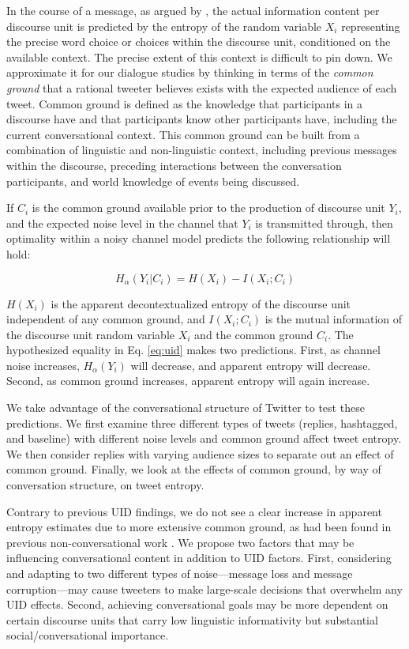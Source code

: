 \documentclass[11pt,letterpaper]{article}
\begin{document}
In the course of a message, as argued by , the actual information content per discourse unit is predicted by the entropy of the random variable $X_i$ representing the precise word choice or choices within the discourse unit, conditioned on the available context.  The precise extent of this context is difficult to pin down. We approximate it for our dialogue studies by thinking in terms of the {\it common ground} \cite{clark1996} that a rational tweeter believes exists with the expected audience of each tweet. Common ground is defined as the knowledge that participants in a discourse have and that participants know other participants have, including the current conversational context. This common ground can be built from a combination of linguistic and non-linguistic context, including previous messages within the discourse, preceding interactions between the conversation participants, and world knowledge of events being discussed.

If $C_i$ is the common ground available prior to the production of discourse unit $Y_i$, and the expected noise level in the channel that $Y_i$ is transmitted through, then optimality within a noisy channel model predicts the following relationship will hold:

\begin{equation}
H_{\alpha}(Y_i|C_i) =  H(X_i) - I(X_i ; C_i) \label{eq:uid}
\end{equation}

$H(X_i)$ is the apparent decontextualized entropy of the discourse unit independent of any common ground, and $I(X_i;C_i)$ is the mutual information of the discourse unit random variable $X_i$ and the common ground $C_i$.  The hypothesized equality in Eq. \ref{eq:uid} makes two predictions. First, as channel noise increases, $H_\alpha(Y_i)$ will decrease, and apparent entropy will decrease. Second, as common ground increases, apparent entropy will again increase.  

We take advantage of the conversational structure of Twitter to test these predictions.  We first examine three different types of tweets (replies, hashtagged, and baseline) with different noise levels and common ground affect tweet entropy.  We then consider replies with varying audience sizes to separate out an effect of common ground.  Finally, we look at the effects of common ground, by way of conversation structure, on tweet entropy.

Contrary to previous UID findings, we do not see a clear increase in apparent entropy estimates due to more extensive common ground, as had been found in previous non-conversational work \cite{genzel2002,doyle2015}.  We propose two factors that may be influencing conversational content in addition to UID factors.  First, considering and adapting to two different types of noise---message loss and message corruption---may cause tweeters to make large-scale decisions that overwhelm any UID effects.  Second, achieving conversational goals may be more dependent on certain discourse units that carry low linguistic informativity but substantial social/conversational importance.
\end{document}
